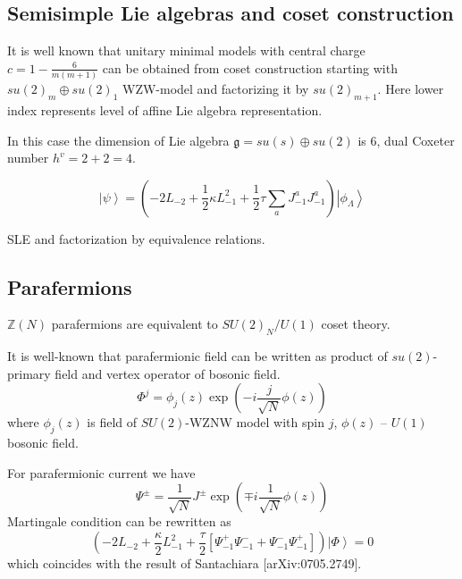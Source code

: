 \documentclass[12pt]{article}
\theoremstyle{definition}
\newcommand{\gf}{\mathfrak{g}}
\theoremstyle{definition} \newtheorem{Def}{Definition}
\begin{document}
\subsection{Semisimple Lie algebras and coset construction}
\label{sec:semis-lie-algebr}

It is well known that unitary minimal models with central charge $c=1-\frac{6}{m(m+1)}$ can be obtained from coset construction starting with $su(2)_{m}\oplus su(2)_{1}$ WZW-model and factorizing it by $su(2)_{m+1}$. Here lower index represents level of affine Lie algebra representation. 

In this case the dimension of Lie algebra $\gf=su(s)\oplus su(2)$ is 6, dual Coxeter number $h^{v}=2+2=4$. 


\begin{equation*}
  \left| \psi\right>=\left(-2 L_{-2}+\frac{1}{2}\kappa L_{-1}^{2}+\frac{1}{2}\tau\sum_{a} J^{a}_{-1} J^{a}_{-1}\right) \left|\phi_{\Lambda}\right>    
\end{equation*}


SLE and factorization by equivalence relations. 

\subsection{Parafermions}

$\mathbb{Z}(N)$ parafermions are equivalent to $SU(2)_{N}/U(1)$ coset theory.

It is well-known that parafermionic field can be written as product of $su(2)$-primary field and vertex operator of bosonic field. 
\begin{equation*}
  \Phi^{j}=\phi_{j}(z) \exp\left( -i \frac{j}{\sqrt{N}}\phi(z)\right)
\end{equation*}
where $\phi_{j}(z)$ is field of $SU(2)$-WZNW model with spin $j$, $\phi(z)$ -- $U(1)$ bosonic field.

For parafermionic current we have
\begin{equation*}
  \Psi^{\pm}=\frac{1}{\sqrt{N}} J^{\pm}\exp\left(\mp i \frac{1}{\sqrt{N}}\phi(z)\right)
\end{equation*}
Martingale condition can be rewritten as
\begin{equation*}
  \left(-2 L_{-2}+\frac{\kappa}{2}L_{-1}^{2}+\frac{\tau}{2}\left[\Psi^{+}_{-1}\Psi^{-}_{-1}+\Psi^{-}_{-1}\Psi^{+}_{-1}\right]\right) \left|\Phi\right>=0
\end{equation*}
which coincides with the result of Santachiara [arXiv:0705.2749].
\end{document}
